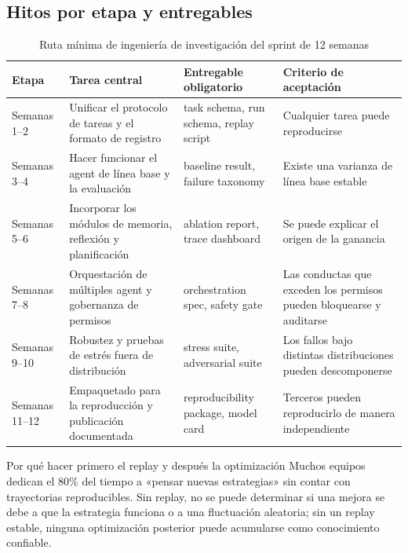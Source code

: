 \subsection{Hitos por etapa y entregables}
\begin{table}[H]
\centering
\begin{tabular}{p{2.2cm}p{3.5cm}p{3.6cm}p{3.2cm}}
\toprule
\textbf{Etapa} & \textbf{Tarea central} & \textbf{Entregable obligatorio} & \textbf{Criterio de aceptación} \\
\midrule
Semanas 1--2 & Unificar el protocolo de tareas y el formato de registro & task schema, run schema, replay script & Cualquier tarea puede reproducirse \\
Semanas 3--4 & Hacer funcionar el agent de línea base y la evaluación & baseline result, failure taxonomy & Existe una varianza de línea base estable \\
Semanas 5--6 & Incorporar los módulos de memoria, reflexión y planificación & ablation report, trace dashboard & Se puede explicar el origen de la ganancia \\
Semanas 7--8 & Orquestación de múltiples agent y gobernanza de permisos & orchestration spec, safety gate & Las conductas que exceden los permisos pueden bloquearse y auditarse \\
Semanas 9--10 & Robustez y pruebas de estrés fuera de distribución & stress suite, adversarial suite & Los fallos bajo distintas distribuciones pueden descomponerse \\
Semanas 11--12 & Empaquetado para la reproducción y publicación documentada & reproducibility package, model card & Terceros pueden reproducirlo de manera independiente \\
\bottomrule
\end{tabular}
\caption{Ruta mínima de ingeniería de investigación del sprint de 12 semanas}
\end{table}

\begin{knowledgebox}{Por qué hacer primero el replay y después la optimización}
Muchos equipos dedican el 80\% del tiempo a «pensar nuevas estrategias» sin contar con trayectorias reproducibles.  
Sin replay, no se puede determinar si una mejora se debe a que la estrategia funciona o a una fluctuación aleatoria; sin un replay estable, ninguna optimización posterior puede acumularse como conocimiento confiable.
\end{knowledgebox}

